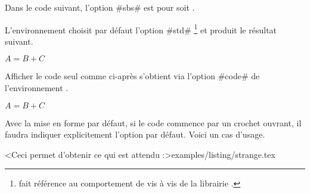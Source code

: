 \begin{bdocexa}
	Dans le code suivant, l'option \bdocinlatex#sbs# est pour  soit .
	
\end{bdocexa}




\begin{bdocexa}[À la suite]
	L'environnement  choisit par défaut l'option \bdocinlatex#std#
	\footnote{
    	 fait référence au comportement  de  vis à vis de la librairie .
	}
	et produit le résultat suivant.

	\begin{bdoclatex}
		$A = B + C$
	\end{bdoclatex}
\end{bdocexa}	




\begin{bdocexa}
	Afficher le code seul comme ci-après s'obtient via l'option \bdocinlatex#code# de l'environnement .

	\begin{bdoclatex}[code]
    	$A = B + C$
	\end{bdoclatex}
\end{bdocexa}




\begin{bdocrem}	
	Avec la mise en forme par défaut, si le code commence par un crochet ouvrant, il faudra indiquer explicitement l'option par défaut. Voici un cas d'usage.
	
	\bdoclatexshow*<Ceci permet d'obtenir ce qui est attendu :>{examples/listing/strange.tex}
\end{bdocrem}


